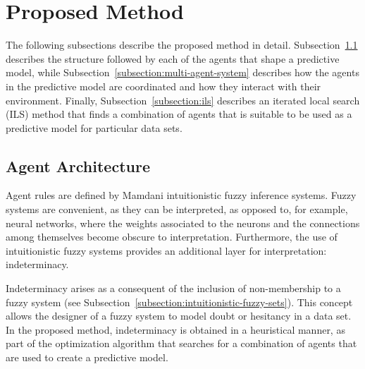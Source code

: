 ﻿\documentclass{ieeeaccess}
\begin{document}

\section{Proposed Method}
\label{section:proposed-method}


The following subsections describe the proposed method in
detail. Subsection~\ref{subsection:agent-architecture} describes the structure
followed by each of the agents that shape a predictive model, while
Subsection~\ref{subsection:multi-agent-system} describes how the agents in the
predictive model are coordinated and how they interact with their
environment. Finally, Subsection~\ref{subsection:ils} describes an
iterated local search (ILS) method that finds a combination of agents that is suitable to be used
as a predictive model for particular data sets.

\subsection{Agent Architecture}
\label{subsection:agent-architecture}

Agent rules are defined by Mamdani intuitionistic fuzzy inference systems. Fuzzy systems
are convenient, as they can be interpreted, as opposed to, for example, neural
networks, where the weights associated to the neurons and the connections among
themselves become obscure to interpretation. Furthermore, the use of
intuitionistic fuzzy systems provides an additional layer for interpretation:
indeterminacy.

Indeterminacy arises as a consequent of the inclusion of non-membership to a %
fuzzy system (see Subsection~\ref{subsection:intuitionistic-fuzzy-sets}). This
concept allows the designer of a fuzzy system to model doubt or hesitancy in a
data set. In the proposed method, indeterminacy is obtained in a heuristical
manner, as part of the optimization algorithm that searches for a combination of
agents that are used to create a predictive model.
\end{document}

